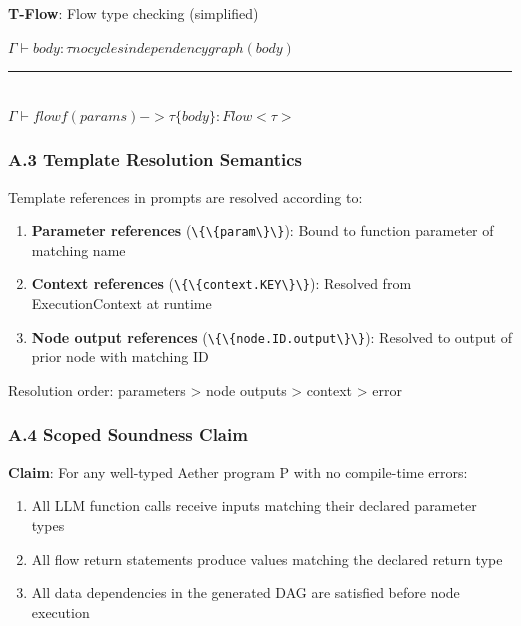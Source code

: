 \documentclass[
]{article}
\newcommand{\passthrough}[1]{#1}
\providecommand{\tightlist}{%
  \setlength{\itemsep}{0pt}\setlength{\parskip}{0pt}}
\begin{document}
\textbf{T-Flow}: Flow type checking (simplified)

\begin{center}
$ \Gamma  \vdash  body : \tau     no cycles in dependency graph(body) $
\\[2pt]
\rule{0.7\linewidth}{0.4pt}
\\[2pt]
$ \Gamma  \vdash  flow f(params) -> \tau  \{ body \} : Flow<\tau > $
\end{center}

\subsubsection{A.3 Template Resolution
Semantics}\label{a.3-template-resolution-semantics}

Template references in prompts are resolved according to:

\begin{enumerate}
\def\labelenumi{\arabic{enumi}.}
\tightlist
\item
  \textbf{Parameter references}
  (\passthrough{\lstinline!\{\{param\}\}!}): Bound to function parameter
  of matching name
\item
  \textbf{Context references}
  (\passthrough{\lstinline!\{\{context.KEY\}\}!}): Resolved from
  ExecutionContext at runtime
\item
  \textbf{Node output references}
  (\passthrough{\lstinline!\{\{node.ID.output\}\}!}): Resolved to output
  of prior node with matching ID
\end{enumerate}

Resolution order: parameters \textgreater{} node outputs \textgreater{}
context \textgreater{} error

\subsubsection{A.4 Scoped Soundness
Claim}\label{a.4-scoped-soundness-claim}

\textbf{Claim}: For any well-typed Aether program P with no compile-time
errors:

\begin{enumerate}
\def\labelenumi{\arabic{enumi}.}
\tightlist
\item
  All LLM function calls receive inputs matching their declared
  parameter types
\item
  All flow return statements produce values matching the declared return
  type
\item
  All data dependencies in the generated DAG are satisfied before node
  execution
\end{enumerate}
\end{document}
